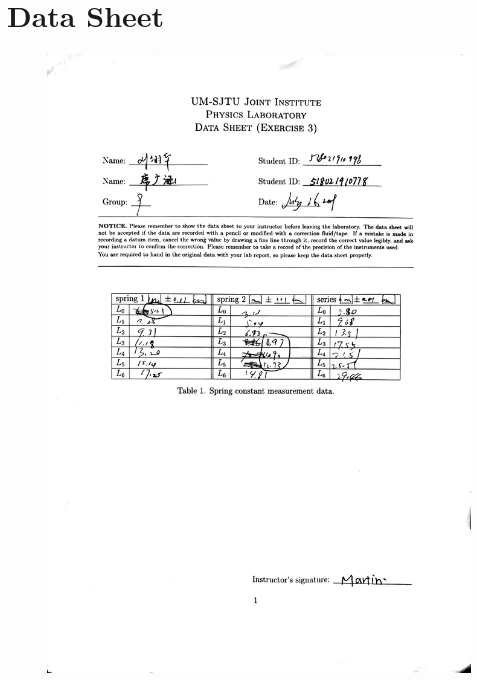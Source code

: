 \documentclass[a4paper]{report}
\begin{document}
	\section{Data Sheet}
	\begin{figure}[H]
		\centering
		\includegraphics[width=1\linewidth]{13.jpg}
	\end{figure}
\end{document}
